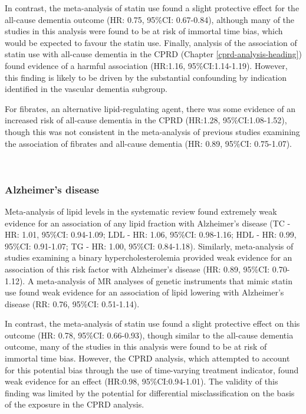 \documentclass[a4paper, twoside]{templates/ociamthesis}
\begin{document}
In contrast, the meta-analysis of statin use found a slight protective effect for the all-cause dementia outcome (HR: 0.75, 95\%CI: 0.67-0.84), although many of the studies in this analysis were found to be at risk of immortal time bias, which would be expected to favour the statin use. Finally, analysis of the association of statin use with all-cause dementia in the CPRD (Chapter \ref{cprd-analysis-heading}) found evidence of a harmful association (HR:1.16, 95\%CI:1.14-1.19). However, this finding is likely to be driven by the substantial confounding by indication identified in the vascular dementia subgroup.

For fibrates, an alternative lipid-regulating agent, there was some evidence of an increased risk of all-cause dementia in the CPRD (HR:1.28, 95\%CI:1.08-1.52), though this was not consistent in the meta-analysis of previous studies examining the association of fibrates and all-cause dementia (HR: 0.89, 95\%CI: 0.75-1.07).

~

\hypertarget{alzheimers-disease-1}{%
\subsubsection{Alzheimer's disease}\label{alzheimers-disease-1}}

Meta-analysis of lipid levels in the systematic review found extremely weak evidence for an association of any lipid fraction with Alzheimer's disease (TC - HR: 1.01, 95\%CI: 0.94-1.09; LDL - HR: 1.06, 95\%CI: 0.98-1.16; HDL - HR: 0.99, 95\%CI: 0.91-1.07; TG - HR: 1.00, 95\%CI: 0.84-1.18). Similarly, meta-analysis of studies examining a binary hypercholesterolemia provided weak evidence for an association of this risk factor with Alzheimer's disease (HR: 0.89, 95\%CI: 0.70-1.12). A meta-analysis of MR analyses of genetic instruments that mimic statin use found weak evidence for an association of lipid lowering with Alzheimer's disease (RR: 0.76, 95\%CI: 0.51-1.14).

In contrast, the meta-analysis of statin use found a slight protective effect on this outcome (HR: 0.78, 95\%CI: 0.66-0.93), though similar to the all-cause dementia outcome, many of the studies in this analysis were found to be at risk of immortal time bias. However, the CPRD analysis, which attempted to account for this potential bias through the use of time-varying treatment indicator, found weak evidence for an effect (HR:0.98, 95\%CI:0.94-1.01). The validity of this finding was limited by the potential for differential misclassification on the basis of the exposure in the CPRD analysis.
\end{document}
